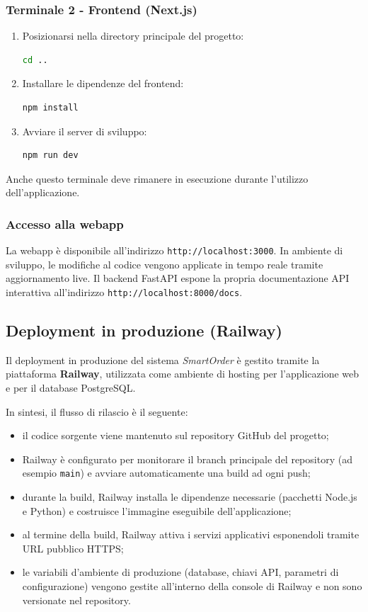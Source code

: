 \documentclass[a4paper, 11pt, oneside]{scrartcl}
\begin{document}
\subsubsection{Terminale 2 - Frontend (Next.js)}
\begin{enumerate}
    \item Posizionarsi nella directory principale del progetto:
          \begin{lstlisting}[language=bash]
cd ..
\end{lstlisting}
    \item Installare le dipendenze del frontend:
          \begin{lstlisting}[language=bash]
npm install
\end{lstlisting}
    \item Avviare il server di sviluppo:
          \begin{lstlisting}[language=bash]
npm run dev
\end{lstlisting}
\end{enumerate}

Anche questo terminale deve rimanere in esecuzione durante l'utilizzo dell'applicazione.

\subsubsection{Accesso alla webapp}
La webapp \`e disponibile all'indirizzo \texttt{http://localhost:3000}.
In ambiente di sviluppo, le modifiche al codice vengono applicate in tempo reale tramite aggiornamento live.
Il backend FastAPI espone la propria documentazione API interattiva all'indirizzo \texttt{http://localhost:8000/docs}.

\subsection{Deployment in produzione (Railway)}

Il deployment in produzione del sistema \textit{SmartOrder} \`e gestito tramite la piattaforma \textbf{Railway}, utilizzata come ambiente di hosting per l'applicazione web e per il database PostgreSQL.

In sintesi, il flusso di rilascio \`e il seguente:
\begin{itemize}
    \item il codice sorgente viene mantenuto sul repository GitHub del progetto;
    \item Railway \`e configurato per monitorare il branch principale del repository (ad esempio \texttt{main}) e avviare automaticamente una build ad ogni push;
    \item durante la build, Railway installa le dipendenze necessarie (pacchetti Node.js e Python) e costruisce l'immagine eseguibile dell'applicazione;
    \item al termine della build, Railway attiva i servizi applicativi esponendoli tramite URL pubblico HTTPS;
    \item le variabili d'ambiente di produzione (database, chiavi API, parametri di configurazione) vengono gestite all'interno della console di Railway e non sono versionate nel repository.
\end{itemize}
\end{document}
